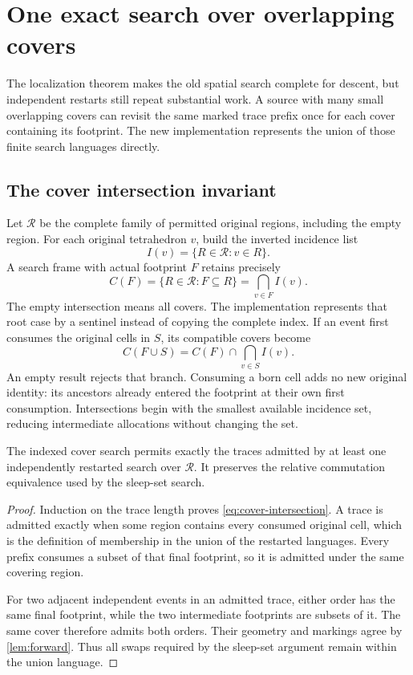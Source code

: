 \section{One exact search over overlapping covers}\label{sec:implementation}

The localization theorem makes the old spatial search complete for descent,
but independent restarts still repeat substantial work. A source with many
small overlapping covers can revisit the same marked trace prefix once for
each cover containing its footprint. The new implementation represents the
union of those finite search languages directly.

\subsection{The cover intersection invariant}

Let $\mathcal R$ be the complete family of permitted original regions,
including the empty region. For each original tetrahedron $v$, build the
inverted incidence list
\[
 I(v)=\{R\in\mathcal R:v\in R\}.
\]
A search frame with actual footprint $F$ retains precisely
\begin{equation}\label{eq:cover-intersection}
 C(F)=\{R\in\mathcal R:F\subseteq R\}
     =\bigcap_{v\in F} I(v).
\end{equation}
The empty intersection means all covers. The implementation represents that
root case by a sentinel instead of copying the complete index. If an event
first consumes the original cells in $S$, its compatible covers become
\[
 C(F\cup S)=C(F)\cap\bigcap_{v\in S}I(v).
\]
An empty result rejects that branch. Consuming a born cell adds no new
original identity: its ancestors already entered the footprint at their
own first consumption. Intersections begin with the smallest available
incidence set, reducing intermediate allocations without changing the set.

\begin{proposition}\label{prop:union}
The indexed cover search permits exactly the traces admitted by at least
one independently restarted search over $\mathcal R$. It preserves the
relative commutation equivalence used by the sleep-set search.
\end{proposition}
\begin{proof}
Induction on the trace length proves \eqref{eq:cover-intersection}. A trace
is admitted exactly when some region contains every consumed original cell,
which is the definition of membership in the union of the restarted
languages. Every prefix consumes a subset of that final footprint, so it
is admitted under the same covering region.

For two adjacent independent events in an admitted trace, either order has
the same final footprint, while the two intermediate footprints are subsets
of it. The same cover therefore admits both orders. Their geometry and
markings agree by \cref{lem:forward}. Thus all swaps required by the
sleep-set argument remain within the union language.
\end{proof}

